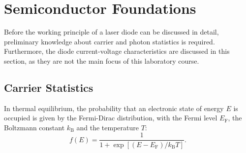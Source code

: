 \section{Semiconductor Foundations}
\label{sec:semiconductor_foundations}

Before the working principle of a laser diode can be discussed in detail, preliminary
knowledge about carrier and photon statistics is required. Furthermore, the diode
current-voltage characteristics are discussed in this section, as they are not the
main focus of this laboratory course.

\subsection{Carrier Statistics}
\label{sec:carrier_statistics}

In thermal equilibrium, the probability that an electronic state of energy $E$ is
occupied is given by the Fermi-Dirac distribution, with the Fermi level $E_{\mathrm{F}}$,
the Boltzmann constant $k_{\mathrm{B}}$ and the temperature $T$:
\begin{equation}
	f(E)=\frac{1}{1+\exp\left[(E-E_{\mathrm{F}})/k_{\mathrm{B}}T\right]}.
\end{equation}

